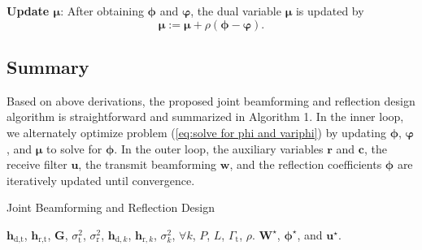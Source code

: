\documentclass[Conference,a4paper]{IEEEtran}
\newcommand{\be}{\begin{equation}}
\newcommand{\ee}{\end{equation}}
\begin{document}
\textbf{Update $\bm{\mu}$}:
After obtaining $\bm{\phi}$ and $\bm{\varphi}$, the dual variable $\bm{\mu}$ is updated by
\be\label{eq:update mu}
\bm{\mu}:=\bm{\mu} + \rho(\bm{\phi}-\bm{\varphi}).
\ee

\subsection{Summary}

Based on above derivations, the proposed joint beamforming and reflection design algorithm is straightforward and summarized in Algorithm 1.
In the inner loop, we alternately optimize problem (\ref{eq:solve for phi and variphi}) by updating $\bm{\phi}$, $\bm{\varphi}$, and $\bm{\mu}$ to solve for $\bm{\phi}$.
In the outer loop, the auxiliary variables $\mathbf{r}$ and $\mathbf{c}$, the receive filter $\mathbf{u}$, the transmit beamforming $\mathbf{w}$, and the reflection coefficients $\bm{\phi}$ are iteratively updated until convergence.

\begin{algorithm}[!t]
\begin{small}
\caption{Joint Beamforming and Reflection Design}
\label{alg}
    \begin{algorithmic}[1]
    \REQUIRE $\mathbf{h}_{\text{d},\text{t}}$, $\mathbf{h}_{\text{r},\text{t}}$, $\mathbf{G}$, $\sigma_\text{t}^2$, $\sigma_\text{r}^2$, $\mathbf{h}_{\text{d},k}$, $\mathbf{h}_{\text{r},k}$, $\sigma_k^2$, $\forall k$, $P$, $L$, $\Gamma_\text{t}$, $\rho$.
    \ENSURE $\mathbf{W}^\star$, $\bm{\phi}^\star$, and $\mathbf{u}^\star$.
            \ENDWHILE
        \ENDWHILE
    \end{algorithmic}
    \end{small}
\end{algorithm}
\end{document}
